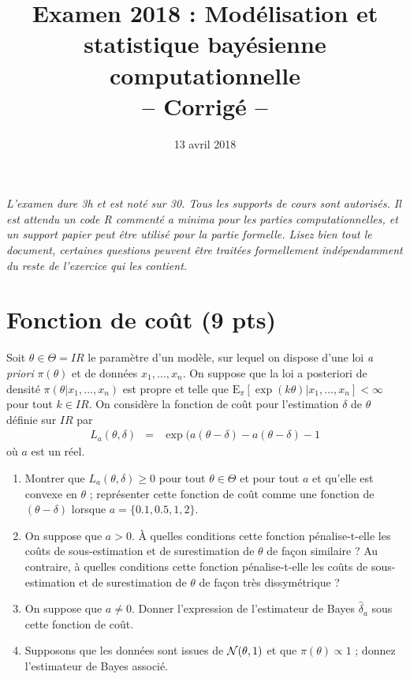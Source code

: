 \documentclass[10pt]{article}
\title{Examen 2018 : Modélisation et statistique bayésienne computationnelle \\ -- Corrig\'e -- }
\date{13 avril 2018}
\newcommand{\R}{I\!\!R}
\newcommand{\E}{\mbox{E}}
\newcommand{\1}{\mathbbm{1}}
\begin{document}
\maketitle

 




{\it L'examen dure 3h et est noté sur 30. Tous les supports de cours sont autorisés. Il est attendu un code R commenté {\it a minima} pour les parties computationnelles, et un support papier peut être utilisé pour la partie formelle. Lisez bien tout le document, certaines questions peuvent être traitées formellement indépendamment du reste de l'exercice qui les contient.} \\


\section{Fonction de coût (9 pts) }

Soit $\theta\in\Theta=\R$ le paramètre d'un modèle, sur lequel on dispose d'une loi {\it a priori} $\pi(\theta)$ et de données $x_1,\ldots,x_n$. On suppose que la loi a posteriori de densité  $\pi(\theta|x_1,\ldots,x_n)$ est propre et telle que $\E_{\pi}[\exp(k\theta)|x_1,\ldots,x_n]<\infty$ pour tout $k\in\R$. On considère la fonction de coût pour l'estimation $\delta$ de $\theta$ définie sur $\R$ par
\begin{eqnarray*}
L_a(\theta,\delta) & = & \exp(a(\theta-\delta) - a(\theta-\delta) - 1
\end{eqnarray*}
où $a$ est un réel.
\begin{enumerate}
\item Montrer que $L_a(\theta,\delta)\geq 0$ pour tout $\theta\in\Theta$ et pour tout $a$ et qu'elle est convexe en $\theta$ ; représenter cette fonction de coût comme une fonction de $(\theta-\delta)$ lorsque $a=\{0.1, 0.5, 1,2\}$. 
\item On suppose que $a>0$. \`A quelles conditions cette fonction pénalise-t-elle les coûts de sous-estimation et de surestimation de $\theta$ de fa\c con similaire ? Au contraire, à quelles conditions cette fonction pénalise-t-elle les coûts de sous-estimation et de surestimation de $\theta$ de fa\c con très dissymétrique ? 
\item On suppose que $a\neq 0$. Donner l'expression de l'estimateur de Bayes $\hat{\delta}_a$ sous cette fonction de coût.
\item Supposons que les données sont issues de ${\cal{N}}(\theta,1)$ et que $\pi(\theta)\propto 1$ ; donnez l'estimateur de Bayes associé.
\end{enumerate}
\end{document}
